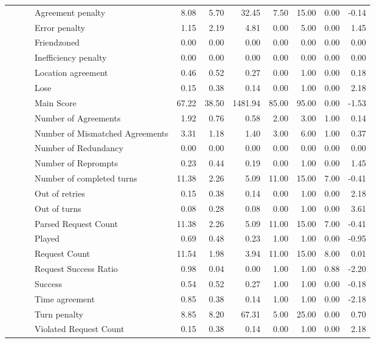 \begin{tabular}{llllrrrrrrr}
 &  &  & Agreement penalty & 8.08 & 5.70 & 32.45 & 7.50 & 15.00 & 0.00 & -0.14 \\
 &  &  & Error penalty & 1.15 & 2.19 & 4.81 & 0.00 & 5.00 & 0.00 & 1.45 \\
 &  &  & Friendzoned & 0.00 & 0.00 & 0.00 & 0.00 & 0.00 & 0.00 & 0.00 \\
 &  &  & Inefficiency penalty & 0.00 & 0.00 & 0.00 & 0.00 & 0.00 & 0.00 & 0.00 \\
 &  &  & Location agreement & 0.46 & 0.52 & 0.27 & 0.00 & 1.00 & 0.00 & 0.18 \\
 &  &  & Lose & 0.15 & 0.38 & 0.14 & 0.00 & 1.00 & 0.00 & 2.18 \\
 &  &  & Main Score & 67.22 & 38.50 & 1481.94 & 85.00 & 95.00 & 0.00 & -1.53 \\
 &  &  & Number of Agreements & 1.92 & 0.76 & 0.58 & 2.00 & 3.00 & 1.00 & 0.14 \\
 &  &  & Number of Mismatched Agreements & 3.31 & 1.18 & 1.40 & 3.00 & 6.00 & 1.00 & 0.37 \\
 &  &  & Number of Redundancy & 0.00 & 0.00 & 0.00 & 0.00 & 0.00 & 0.00 & 0.00 \\
 &  &  & Number of Reprompts & 0.23 & 0.44 & 0.19 & 0.00 & 1.00 & 0.00 & 1.45 \\
 &  &  & Number of completed turns & 11.38 & 2.26 & 5.09 & 11.00 & 15.00 & 7.00 & -0.41 \\
 &  &  & Out of retries & 0.15 & 0.38 & 0.14 & 0.00 & 1.00 & 0.00 & 2.18 \\
 &  &  & Out of turns & 0.08 & 0.28 & 0.08 & 0.00 & 1.00 & 0.00 & 3.61 \\
 &  &  & Parsed Request Count & 11.38 & 2.26 & 5.09 & 11.00 & 15.00 & 7.00 & -0.41 \\
 &  &  & Played & 0.69 & 0.48 & 0.23 & 1.00 & 1.00 & 0.00 & -0.95 \\
 &  &  & Request Count & 11.54 & 1.98 & 3.94 & 11.00 & 15.00 & 8.00 & 0.01 \\
 &  &  & Request Success Ratio & 0.98 & 0.04 & 0.00 & 1.00 & 1.00 & 0.88 & -2.20 \\
 &  &  & Success & 0.54 & 0.52 & 0.27 & 1.00 & 1.00 & 0.00 & -0.18 \\
 &  &  & Time agreement & 0.85 & 0.38 & 0.14 & 1.00 & 1.00 & 0.00 & -2.18 \\
 &  &  & Turn penalty & 8.85 & 8.20 & 67.31 & 5.00 & 25.00 & 0.00 & 0.70 \\
 &  &  & Violated Request Count & 0.15 & 0.38 & 0.14 & 0.00 & 1.00 & 0.00 & 2.18 \\

\end{tabular}
